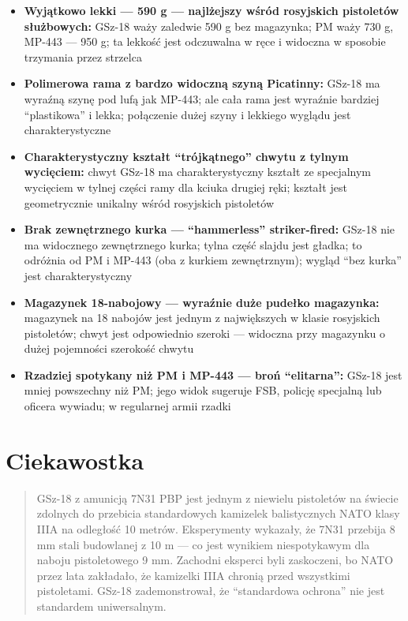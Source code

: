 \documentclass[12pt,openany,oneside]{book}
\providecommand{\tightlist}{%
  \setlength{\itemsep}{0pt}\setlength{\parskip}{0pt}}
\begin{document}
\begin{itemize}
\tightlist
\item
  \textbf{Wyjątkowo lekki --- 590 g --- najlżejszy wśród rosyjskich
  pistoletów służbowych:} GSz-18 waży zaledwie 590 g bez magazynka; PM
  waży 730 g, MP-443 --- 950 g; ta lekkość jest odczuwalna w ręce i
  widoczna w sposobie trzymania przez strzelca
\item
  \textbf{Polimerowa rama z bardzo widoczną szyną Picatinny:} GSz-18 ma
  wyraźną szynę pod lufą jak MP-443; ale cała rama jest wyraźnie
  bardziej ``plastikowa'' i lekka; połączenie dużej szyny i lekkiego
  wyglądu jest charakterystyczne
\item
  \textbf{Charakterystyczny kształt ``trójkątnego'' chwytu z tylnym
  wycięciem:} chwyt GSz-18 ma charakterystyczny kształt ze specjalnym
  wycięciem w tylnej części ramy dla kciuka drugiej ręki; kształt jest
  geometrycznie unikalny wśród rosyjskich pistoletów
\item
  \textbf{Brak zewnętrznego kurka --- ``hammerless'' striker-fired:}
  GSz-18 nie ma widocznego zewnętrznego kurka; tylna część slajdu jest
  gładka; to odróżnia od PM i MP-443 (oba z kurkiem zewnętrznym); wygląd
  ``bez kurka'' jest charakterystyczny
\item
  \textbf{Magazynek 18-nabojowy --- wyraźnie duże pudełko magazynka:}
  magazynek na 18 nabojów jest jednym z największych w klasie rosyjskich
  pistoletów; chwyt jest odpowiednio szeroki --- widoczna przy magazynku
  o dużej pojemności szerokość chwytu
\item
  \textbf{Rzadziej spotykany niż PM i MP-443 --- broń ``elitarna'':}
  GSz-18 jest mniej powszechny niż PM; jego widok sugeruje FSB, policję
  specjalną lub oficera wywiadu; w regularnej armii rzadki
\end{itemize}

\section{Ciekawostka}\label{ciekawostka-92}

\begin{quote}
GSz-18 z amunicją 7N31 PBP jest jednym z niewielu pistoletów na świecie
zdolnych do przebicia standardowych kamizelek balistycznych NATO klasy
IIIA na odległość 10 metrów. Eksperymenty wykazały, że 7N31 przebija 8
mm stali budowlanej z 10 m --- co jest wynikiem niespotykawym dla naboju
pistoletowego 9 mm. Zachodni eksperci byli zaskoczeni, bo NATO przez
lata zakładało, że kamizelki IIIA chronią przed wszystkimi pistoletami.
GSz-18 zademonstrował, że ``standardowa ochrona'' nie jest standardem
uniwersalnym.
\end{quote}
\end{document}
